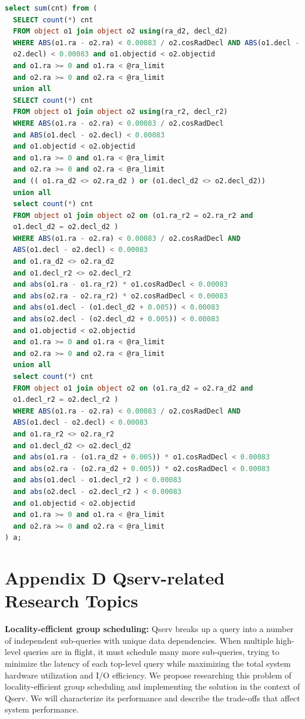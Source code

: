 \documentclass[DM,lsstdraft,toc]{lsstdoc}
\begin{document}
\begin{lstlisting}[language=SQL]
select sum(cnt) from (
  SELECT count(*) cnt
  FROM object o1 join object o2 using(ra_d2, decl_d2)
  WHERE ABS(o1.ra - o2.ra) < 0.00083 / o2.cosRadDecl AND ABS(o1.decl -
  o2.decl) < 0.00083 and o1.objectid < o2.objectid
  and o1.ra >= 0 and o1.ra < @ra_limit
  and o2.ra >= 0 and o2.ra < @ra_limit
  union all
  SELECT count(*) cnt
  FROM object o1 join object o2 using(ra_r2, decl_r2)
  WHERE ABS(o1.ra - o2.ra) < 0.00083 / o2.cosRadDecl
  and ABS(o1.decl - o2.decl) < 0.00083
  and o1.objectid < o2.objectid
  and o1.ra >= 0 and o1.ra < @ra_limit
  and o2.ra >= 0 and o2.ra < @ra_limit
  and (( o1.ra_d2 <> o2.ra_d2 ) or (o1.decl_d2 <> o2.decl_d2))
  union all
  select count(*) cnt
  FROM object o1 join object o2 on (o1.ra_r2 = o2.ra_r2 and
  o1.decl_d2 = o2.decl_d2 )
  WHERE ABS(o1.ra - o2.ra) < 0.00083 / o2.cosRadDecl AND
  ABS(o1.decl - o2.decl) < 0.00083
  and o1.ra_d2 <> o2.ra_d2
  and o1.decl_r2 <> o2.decl_r2
  and abs(o1.ra - o1.ra_r2) * o1.cosRadDecl < 0.00083
  and abs(o2.ra - o2.ra_r2) * o2.cosRadDecl < 0.00083
  and abs(o1.decl - (o1.decl_d2 + 0.005)) < 0.00083
  and abs(o2.decl - (o2.decl_d2 + 0.005)) < 0.00083
  and o1.objectid < o2.objectid
  and o1.ra >= 0 and o1.ra < @ra_limit
  and o2.ra >= 0 and o2.ra < @ra_limit
  union all
  select count(*) cnt
  FROM object o1 join object o2 on (o1.ra_d2 = o2.ra_d2 and
  o1.decl_r2 = o2.decl_r2 )
  WHERE ABS(o1.ra - o2.ra) < 0.00083 / o2.cosRadDecl AND
  ABS(o1.decl - o2.decl) < 0.00083
  and o1.ra_r2 <> o2.ra_r2
  and o1.decl_d2 <> o2.decl_d2
  and abs(o1.ra - (o1.ra_d2 + 0.005)) * o1.cosRadDecl < 0.00083
  and abs(o2.ra - (o2.ra_d2 + 0.005)) * o2.cosRadDecl < 0.00083
  and abs(o1.decl - o1.decl_r2 ) < 0.00083
  and abs(o2.decl - o2.decl_r2 ) < 0.00083
  and o1.objectid < o2.objectid
  and o1.ra >= 0 and o1.ra < @ra_limit
  and o2.ra >= 0 and o2.ra < @ra_limit
) a;
\end{lstlisting}

\section{Appendix D Qserv-related Research
Topics}\label{appendix-d-qserv-related-research-topics}

\textbf{Locality-efficient group scheduling:} Qserv breaks up a query
into a number of independent sub-queries with unique data dependencies.
When multiple high-level queries are in flight, it must schedule many
more sub-queries, trying to minimize the latency of each top-level query
while maximizing the total system hardware utilization and I/O
efficiency. We propose researching this problem of locality-efficient
group scheduling and implementing the solution in the context of Qserv.
We will characterize its performance and describe the trade-offs that
affect system performance.
\end{document}
